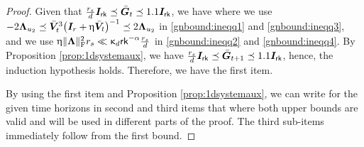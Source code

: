 \begin{proof}
Given that   $\tfrac{r_s}{d} \boldsymbol{I}_{\mathsf{rk}} \preceq \bar{\boldsymbol{G}}_{t} \preceq 1.1 \boldsymbol{I}_{\mathsf{rk}}$,  we have
where we use  $- 2 \boldsymbol{\Lambda}_{u_2} \preceq  \bar{\boldsymbol{V}}_{t}^3 \big(\boldsymbol{I}_r +   \upeta  \bar{\boldsymbol{V}}_{t} \big)^{-1} \preceq 2 \boldsymbol{\Lambda}_{u_2}$   in  \eqref{gnbound:ineqq1} and    \eqref{gnbound:ineqq3},  and  we use   $\upeta  \lVert\boldsymbol{\Lambda}\rVert_\mathrm{F}^2 r_s \ll \upkappa_d \mathsf{rk}^{- \alpha}\frac{r_s}{d}$   in  \eqref{gnbound:ineqq2} and  \eqref{gnbound:ineqq4}.   By  Proposition \ref{prop:1dsystemaux}, we have   $\frac{r_s}{d} \boldsymbol{I}_{\mathsf{rk}} \preceq \bar{\boldsymbol{G}}_{t+1} \preceq 1.1 \boldsymbol{I}_{\mathsf{rk}}$, hence, the induction hypothesis holds. Therefore, we have the first item. 

\smallskip
By using the first item and  Proposition \ref{prop:1dsystemaux}, we can write for the given time horizons in second and third items that
where both upper bounds are valid and will be used in different parts of the proof.  The third sub-items immediately follow from the first bound.


\end{proof}
